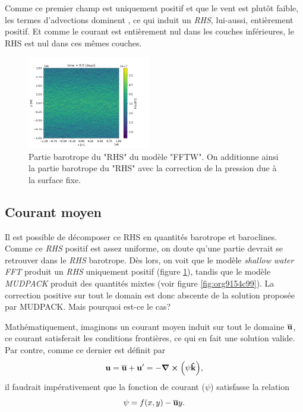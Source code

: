 \documentclass[10pt]{article}
\numberwithin{equation}{section}
\newcommand{\kvf}{\vb{\hat{k}}}
\newcommand{\uu}{\vb{u}}
\begin{document}
Comme ce premier champ est uniquement positif et que le vent est plutôt faible, les termes d'advections dominent , ce qui induit un \emph{RHS}, lui-aussi, entièrement positif.
Et comme le courant est entièrement nul dans les couches inférieures, le RHS est nul dans ces mêmes couches. \bigskip

\begin{figure} \vspace{-\baselineskip} \centering
\centering
\includegraphics[width=0.48\textwidth]{figures/debuggage/2023_06_12_RHSuBTfftw.png}
\caption{\label{fig:org8f6b64f}Partie barotrope du "RHS" du modèle "FFTW". On additionne ainsi la partie barotrope du "RHS" avec la correction de la pression due à la surface fixe.}
\end{figure}
\subsection{Courant moyen}
\label{sec:org81e0eaa}

Il est possible de décomposer ce RHS en quantités barotrope et baroclines.
Comme ce \emph{RHS} positif est assez uniforme, on doute qu'une partie devrait se retrouver dans le \emph{RHS} barotrope.
Dès lors, on voit que le modèle \emph{shallow water FFT} produit un \emph{RHS} uniquement positif (figure \ref{fig:org8f6b64f}), tandis que le modèle \emph{MUDPACK} produit des quantités mixtes (voir figure \ref{fig:org9154c99}).
La correction positive sur tout le domain est donc abscente de la solution proposée par MUDPACK.
Mais pourquoi est-ce le cas?\bigskip

Mathématiquement, imaginons un courant moyen induit sur tout le domaine \(\overline{\uu}\), ce courant satisferait les conditions frontières, ce qui en fait une solution valide.
Par contre, comme ce dernier est définit par
\begin{equation}
   \uu = \overline{\uu} + \uu' = - \curl(\psi\kvf),
\end{equation}
il faudrait impérativement que la fonction de courant (\(\psi\)) satisfasse la relation
\begin{equation}
\label{eq:org3080af8}
   \psi = f(x,y) - \overline{\uu} y.
\end{equation}
\end{document}
